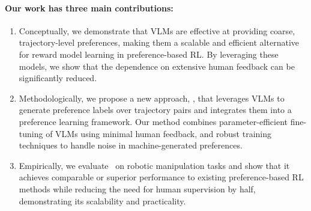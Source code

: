 \begin{mdframed}[innertopmargin=0pt,leftmargin=0pt, rightmargin=0pt, innerleftmargin=10pt, innerrightmargin=10pt, skipbelow=0pt]
\paragraph{Our work has three main contributions:}
\begin{enumerate}[leftmargin=*]
    \item Conceptually, we demonstrate that VLMs are effective at providing coarse, trajectory-level preferences, making them a scalable and efficient alternative for reward model learning in preference-based RL. By leveraging these models, we show that the dependence on extensive human feedback can be significantly reduced.
    \item Methodologically, we propose a new approach, \algo, that leverages VLMs to generate preference labels over trajectory pairs and integrates them into a preference learning framework. Our method combines parameter-efficient fine-tuning of VLMs using minimal human feedback, and robust training techniques to handle noise in machine-generated preferences.
    \item Empirically, we evaluate \algo~on robotic manipulation tasks and show that it achieves comparable or superior performance to existing preference-based RL methods while reducing the need for human supervision by half, demonstrating its scalability and practicality.
\end{enumerate}
\end{mdframed}





